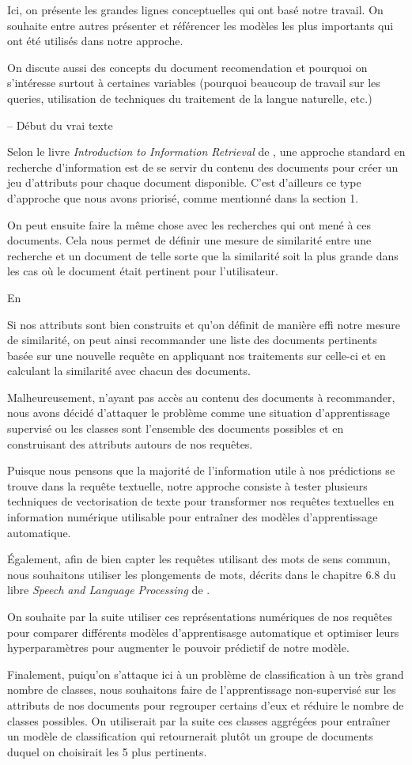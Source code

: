 Ici, on présente les grandes lignes conceptuelles qui ont basé notre travail.
On souhaite entre autres présenter et référencer les modèles les plus importants qui ont été utilisés dans notre approche.

On discute aussi des concepts du document recomendation et pourquoi on s'intéresse surtout à certaines variables (pourquoi beaucoup de travail sur les queries, utilisation de techniques du traitement de la langue naturelle, etc.)

-- Début du vrai texte

Selon le livre \emph{Introduction to Information Retrieval} de \cite{schutze2008introduction}, une approche standard en recherche d'information est de se servir du contenu des documents pour créer un jeu d'attributs pour chaque document disponible. C'est d'ailleurs ce type d'approche que nous avons priorisé, comme mentionné dans la section 1.

On peut ensuite faire la même chose avec les recherches qui ont mené à ces documents. Cela nous permet de définir une mesure de similarité entre une recherche et un document de telle sorte que la similarité soit la plus grande dans les cas où le document était pertinent pour l'utilisateur.

En 

Si nos attributs sont bien construits et qu'on définit de manière effi notre mesure de similarité, on peut ainsi recommander une liste des documents pertinents basée sur une nouvelle requête en appliquant nos traitements sur celle-ci et en calculant la similarité avec chacun des documents.


Malheureusement, n'ayant pas accès au contenu des documents à recommander, nous avons décidé d'attaquer le problème comme une situation d'apprentissage supervisé ou les classes sont l'ensemble des documents possibles et en construisant des attributs autours de nos requêtes.

Puisque nous pensons que la majorité de l'information utile à nos prédictions se trouve dans la requête textuelle, notre approche consiste à tester plusieurs techniques de vectorisation de texte pour transformer nos requêtes textuelles en information numérique utilisable pour entraîner des modèles d'apprentissage automatique.

Également, afin de bien capter les requêtes utilisant des mots de sens commun, nous souhaitons utiliser les plongements de mots, décrits dans le chapitre 6.8 du libre \emph{Speech and Language Processing} de \cite{jurafsky2014speech}.

On souhaite par la suite utiliser ces représentations numériques de nos requêtes pour comparer différents modèles d'apprentisasge automatique et optimiser leurs hyperparamètres pour augmenter le pouvoir prédictif de notre modèle.

Finalement, puiqu'on s'attaque ici à un problème de classification à un très grand nombre de classes, nous souhaitons faire de l'apprentissage non-supervisé sur les attributs de nos documents pour regrouper certains d'eux et réduire le nombre de classes possibles. On utiliserait par la suite ces classes aggrégées pour entraîner un modèle de classification qui retournerait plutôt un groupe de documents duquel on choisirait les 5 plus pertinents.

